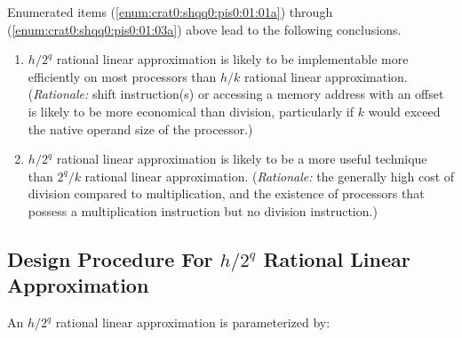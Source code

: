 Enumerated items
(\ref{enum:crat0:shqq0:pis0:01:01a}) through
(\ref{enum:crat0:shqq0:pis0:01:03a}) above lead to the following conclusions.

\begin{enumerate}
\item $h/2^q$ rational linear approximation is likely to be implementable 
      more efficiently on most processors than $h/k$ rational linear approximation.
	  (\emph{Rationale:}  shift instruction(s) or accessing a 
	  memory address with an offset
	  is
	  likely to be more economical than division, particularly if $k$ would exceed 
	  the native
	  operand size of the processor.)
\item $h/2^q$ rational linear approximation is likely to be a more useful
      technique than $2^q/k$ rational linear approximation.
	  (\emph{Rationale:}  the generally high cost of division compared to 
	  multiplication, and the existence of processors that possess a multiplication 
	  instruction but no division instruction.)
\end{enumerate}


\subsection[Design Procedure For \protect\mbox{\protect$h/2^q$} Rational Linear Approximations]
           {Design Procedure For \protect\mbox{\protect\boldmath$h/2^q$} Rational Linear Approximation}
\label{crat0:shqq0:dph0}

An $h/2^q$ rational linear approximation is parameterized by:

